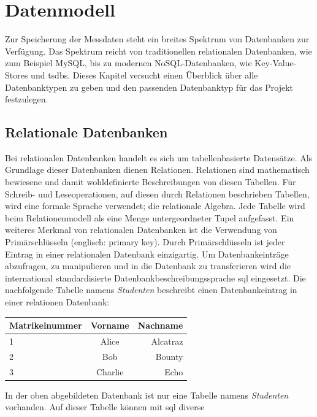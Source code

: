 \documentclass[titlepage]{report}
\begin{document}
\section*{Datenmodell}
Zur Speicherung der Messdaten steht ein breites Spektrum von Datenbanken
zur Verfügung. Das Spektrum reicht von traditionellen relationalen
Datenbanken, wie zum Beispiel MySQL, bis zu modernen
NoSQL\hyp{}Datenbanken, wie Key\hyp{}Value\hyp{}Stores und \glspl{tsdb}.
Dieses Kapitel versucht einen Überblick über alle Datenbanktypen zu
geben und den passenden Datenbanktyp für das Projekt festzulegen.
\subsection*{Relationale Datenbanken}
Bei relationalen Datenbanken handelt es sich um tabellenbasierte
Datensätze. Als Grundlage dieser Datenbanken dienen Relationen.
Relationen sind mathematisch bewiesene und damit wohldefinierte
Beschreibungen von diesen Tabellen. Für Schreib\hyp{} und
Leseoperationen, auf diesen durch Relationen beschrieben Tabellen, wird
eine formale Sprache verwendet; die relationale Algebra. Jede Tabelle
wird beim Relationenmodell als eine Menge untergeordneter Tupel
aufgefasst\cite[S. 4]{MEIER2013}. Ein weiteres Merkmal von relationalen
Datenbanken ist die Verwendung von Primärschlüsseln (englisch: primary
key). Durch Primärschlüsseln ist jeder Eintrag in einer relationalen
Datenbank einzigartig. Um Datenbankeinträge abzufragen, zu manipulieren
und in die Datenbank zu transferieren wird die international
standardisierte Datenbankbeschreibungssprache \gls{sql} eingesetzt. Die
nachfolgende Tabelle namens \emph{Studenten} beschreibt einen
Datenbankeintrag in einer relationen Datenbank:
\begin{center}
    \begin{tabular}{l c r}
        \toprule
        Matrikelnummer & Vorname & Nachname \\
        \midrule
        1              & Alice   & Alcatraz \\
        2              & Bob     & Bounty   \\
        3              & Charlie & Echo     \\
        \bottomrule
    \end{tabular}
\end{center}
In der oben abgebildeten Datenbank ist nur eine Tabelle namens
\emph{Studenten} vorhanden. Auf dieser Tabelle können mit \gls{sql} diverse
\end{document}
